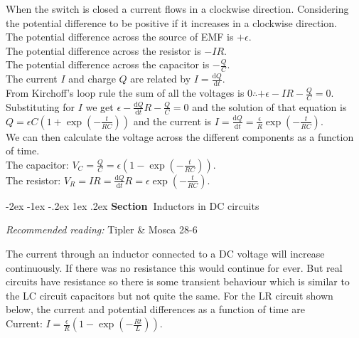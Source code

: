 \documentclass[
]{book}
\makeatletter
\renewcommand\section{%
\@startsection{section}{1}{\z@}%
              {-2ex \@plus -1ex \@minus -.2ex}%
              {1ex \@plus .2ex}%
              {\sffamily\bfseries\large\noindent Section~}}
\numberwithin{equation}{section}
\makeatother
\begin{document}
When the switch is closed a current flows in a clockwise direction.
Considering the potential difference to be positive if it increases in a
clockwise direction.\\
The potential difference across the source of EMF is \(+\epsilon\).\\
The potential difference across the resistor is \(-IR\).\\
The potential difference across the capacitor is \(-\frac{Q}{C}\).\\
The current \(I\) and charge \(Q\) are related by \(I = \frac{\mathrm{d} Q}{\mathrm{d} t}\).\\
From Kirchoff's loop rule the sum of all the voltages is
\(0 \therefore +\epsilon - IR - \frac{Q}{C} = 0\).\\
Substituting for \(I\) we get
\(\epsilon - \frac{\mathrm{d} Q}{\mathrm{d} t} R - \frac{Q}{C} = 0\) and the solution of
that equation is
\(Q = \epsilon C \left(1 + \exp⁡\left(-\frac{t}{RC} \right) \right)\) and
the current is
\(I = \frac{\mathrm{d} Q}{\mathrm{d} t} = \frac{\epsilon}{R} \exp\left( - \frac{t}{RC} \right)\).\\
We can then calculate the voltage across the different components as a
function of time.\\
The capacitor:
\(V_C = \frac{Q}{C} = \epsilon \left(1 - \exp⁡ \left(- \frac{t}{RC} \right) \right)\).\\
The resistor:
\(V_R = IR = \frac{\mathrm{d} Q}{\mathrm{d} t} R = \epsilon \exp⁡\left(- \frac{t}{RC} \right)\).

\hypertarget{inductors-in-dc-circuits}{%
\section{Inductors in DC circuits}\label{inductors-in-dc-circuits}}

\emph{Recommended reading:} Tipler \& Mosca 28-6

The current through an inductor connected to a DC voltage will increase
continuously. If there was no resistance this would continue for ever.
But real circuits have resistance so there is some transient behaviour
which is similar to the LC circuit capacitors but not quite the same.
For the LR circuit shown below, the current and potential differences as
a function of time are\\

Current:
\(I = \frac{\epsilon}{R} \left(1 - \exp\left(-\frac{Rt}{L}\right) \right)\).\\
\end{document}

